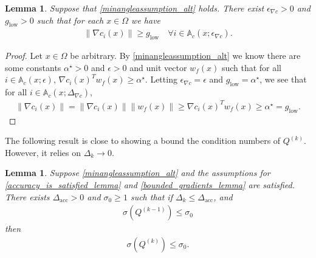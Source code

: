 \documentclass{article}
\newtheorem{lemma}[theorem]{Lemma}
\theoremstyle{case}
\numberwithin{theorem}{subsection}
\newcommand{\dacc}{{\Delta_{\textrm{acc}}}}
\newcommand{\dk}{\Delta_k}
\newcommand{\minanglealpha}{{ \alpha^{\star} }}
\newcommand{\mingraddelta}{{\Delta_{\nabla c}}}
\newcommand{\mingradepsilon}{{\epsilon_{\nabla c}}}
\newcommand{\mingrad}{{ g_{\textrm{low}} }}
\newcommand{\qk}{{Q^{(k)}}}
\newcommand{\minanglediralt}{{w_f}}
\newcommand{\epsactive}{{\mathbb A_c}}
\begin{document}
\begin{lemma}
\label{mingradlemma}
Suppose that 
\cref{minangleassumption_alt} holds.
There exist $\mingradepsilon > 0$ and $\mingrad > 0$ such that for each $x \in \Omega$ we have
\begin{align*}
\| \nabla c_i(x) \| \ge \mingrad \quad \forall i \in \epsactive(x; \mingradepsilon).
\end{align*}
\end{lemma}
\begin{proof}
Let $x \in \Omega$ be arbitrary.
By \cref{minangleassumption_alt} we know there are some constants $\minanglealpha>0$ and $\epsilon>0$ and unit vector $\minanglediralt(x)$ such that for all $i \in \epsactive(x; \epsilon)$,
$\nabla c_i(x)^T\minanglediralt(x) \ge \minanglealpha$.
Letting $\mingradepsilon = \epsilon$ and $\mingrad = \minanglealpha$, we see that for all $i \in \epsactive(x; \mingraddelta)$,
\begin{align*}
\|\nabla c_i(x)\| = \|\nabla c_i(x)\| \|\minanglediralt(x)\| \ge \nabla c_i(x)^T\minanglediralt(x) \ge \minanglealpha = \mingrad.
\end{align*}
\end{proof}

The following result is close to showing a bound the condition numbers of $\qk$.
However, it relies on $\dk \to 0$.
\begin{lemma}
Suppose \cref{minangleassumption_alt}
and the assumptions for \cref{accuracy_is_satisfied_lemma} and \cref{bounded_gradients_lemma} are satisfied.
There exists $\dacc > 0$ and $\sigma_0 \ge 1$ such that if $\dk \le \dacc$, and
\begin{align}
\sigma\left( Q^{(k-1)} \right) \le \sigma_0 \label{idk_alt_proof_statement1}
\end{align}
then 
\begin{align}
\sigma\left( \qk \right) \le \sigma_0. \label{idk_alt_proof_statement2}
\end{align}
\end{lemma}
\end{document}
